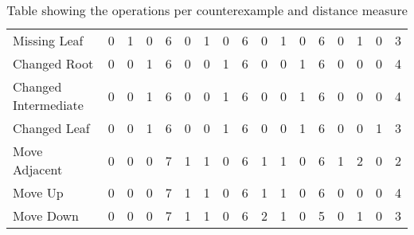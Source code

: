 \begin{table*}[b!]
{\begin{tabular}{lcccccccccccccccc}
          Missing Leaf         & 0                                    & 1                                        & 0                                      & 6                                       & 0      & 1   & 0      & 6     & 0      & 1   & 0      & 6     & 0      & 1   & 0      & 3     \\
          Changed Root         & 0                                    & 0                                        & 1                                      & 6                                       & 0      & 0   & 1      & 6     & 0      & 0   & 1      & 6     & 0      & 0   & 0      & 4     \\
          Changed Intermediate & 0                                    & 0                                        & 1                                      & 6                                       & 0      & 0   & 1      & 6     & 0      & 0   & 1      & 6     & 0      & 0   & 0      & 4     \\
          Changed Leaf         & 0                                    & 0                                        & 1                                      & 6                                       & 0      & 0   & 1      & 6     & 0      & 0   & 1      & 6     & 0      & 0   & 1      & 3     \\
          Move Adjacent        & 0                                    & 0                                        & 0                                      & 7                                       & 1      & 1   & 0      & 6     & 1      & 1   & 0      & 6     & 1      & 2   & 0      & 2     \\
          Move Up              & 0                                    & 0                                        & 0                                      & 7                                       & 1      & 1   & 0      & 6     & 1      & 1   & 0      & 6     & 0      & 0   & 0      & 4     \\
          Move Down            & 0                                    & 0                                        & 0                                      & 7                                       & 1      & 1   & 0      & 6     & 2      & 1   & 0      & 5     & 0      & 1   & 0      & 3     \\
          \bottomrule
      \end{tabular}

  }
  \caption{Table showing the operations per counterexample and distance measure}
\end{table*}





